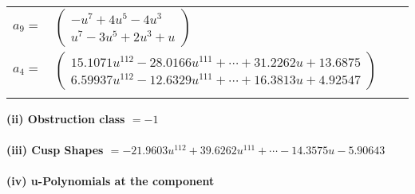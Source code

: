 \documentclass[1p]{elsarticle_modified}
\theoremstyle{definition}
\begin{document}
\begin{tabular}{m{7pt} m{180pt} m{7pt} m{180pt} }
\flushright $a_{9}=$&$\begin{pmatrix}- u^7+4 u^5-4 u^3\\u^7-3 u^5+2 u^3+u\end{pmatrix}$ \\
\flushright $a_{4}=$&$\begin{pmatrix}15.1071 u^{112}-28.0166 u^{111}+\cdots+31.2262 u+13.6875\\6.59937 u^{112}-12.6329 u^{111}+\cdots+16.3813 u+4.92547\end{pmatrix}$\\&\end{tabular}
\flushleft \textbf{(ii) Obstruction class $= -1$}\\~\\
\flushleft \textbf{(iii) Cusp Shapes $= -21.9603 u^{112}+39.6262 u^{111}+\cdots-14.3575 u-5.90643$}\\~\\
\newpage\renewcommand{\arraystretch}{1}
\flushleft \textbf{(iv) u-Polynomials at the component}\newline \\
\end{document}
